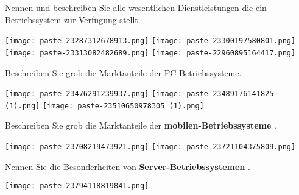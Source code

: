 \documentclass{article}
\begin{document}
\begin{tcolorbox}[colback=white!10!white,colframe=lightgray!75!black,
  savelowerto=\jobname_ex.tex]

\begin{center}
Nennen und beschreiben Sie alle wesentlichen Dienstleistungen die ein Betriebssystem zur Verfügung stellt.

\end{center}

\tcblower

\justifying
\texttt{[image: paste-23287312678913.png]}
\texttt{[image: paste-23300197580801.png]}
\texttt{[image: paste-23313082482689.png]}
\texttt{[image: paste-22960895164417.png]}

\end{tcolorbox}
\begin{tcolorbox}[colback=white!10!white,colframe=lightgray!75!black,
  savelowerto=\jobname_ex.tex]

\begin{center}
Beschreiben Sie grob die Marktanteile der PC-Betriebssysteme.

\end{center}

\tcblower

\justifying
\texttt{[image: paste-23476291239937.png]}
\texttt{[image: paste-23489176141825 (1).png]}
\texttt{[image: paste-23510650978305 (1).png]}

\end{tcolorbox}
\begin{tcolorbox}[colback=white!10!white,colframe=lightgray!75!black,
  savelowerto=\jobname_ex.tex]

\begin{center}
Beschreiben Sie grob die Marktanteile der 
\textbf{mobilen-Betriebssysteme
}.

\end{center}

\tcblower

\justifying
\texttt{[image: paste-23708219473921.png]}
\texttt{[image: paste-23721104375809.png]}

\end{tcolorbox}
\begin{tcolorbox}[colback=white!10!white,colframe=lightgray!75!black,
  savelowerto=\jobname_ex.tex]

\begin{center}
Nennen Sie die Besonderheiten von 
\textbf{Server-Betriebssystemen
}.

\end{center}

\tcblower

\justifying
\texttt{[image: paste-23794118819841.png]}

\end{tcolorbox}
\end{document}
